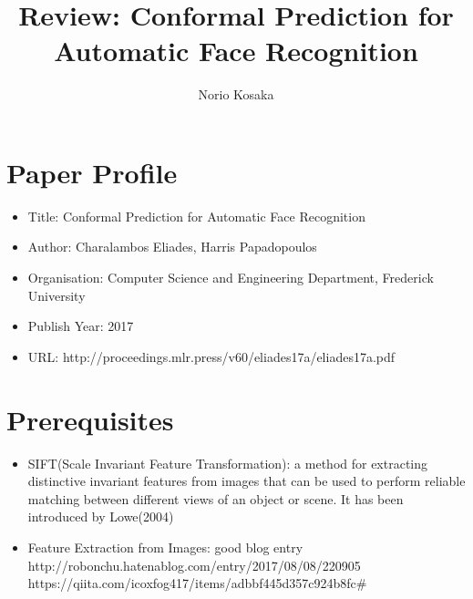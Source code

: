 \documentclass[10pt,a4paper]{article}
\author{Norio Kosaka}
\title{Review: Conformal Prediction for Automatic Face Recognition}
\begin{document}
\maketitle

\section{Paper Profile}
\begin{itemize}
\item Title: Conformal Prediction for Automatic Face Recognition
\item Author: Charalambos Eliades, Harris Papadopoulos
\item Organisation: Computer Science and Engineering Department, Frederick University
\item Publish Year: 2017
\item URL: http://proceedings.mlr.press/v60/eliades17a/eliades17a.pdf
\end{itemize}

\section{Prerequisites}
\begin{itemize}
    \item SIFT(Scale Invariant Feature Transformation): a method for extracting distinctive invariant features from images that can be used to perform reliable matching between different views of an object or scene. It has been introduced by Lowe(2004) \cite{lowe2004distinctive}
    \item Feature Extraction from Images: good blog entry\\
    http://robonchu.hatenablog.com/entry/2017/08/08/220905 \\
    https://qiita.com/icoxfog417/items/adbbf445d357c924b8fc#%
\end{itemize}
\end{document}
